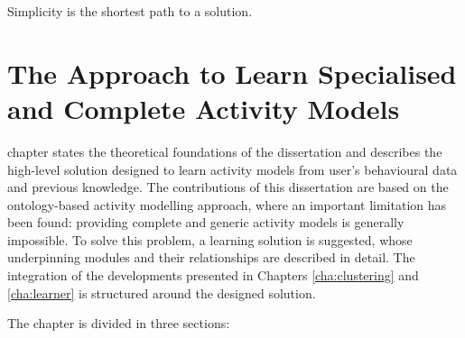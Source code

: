 

\begin{savequote}[50mm]
Simplicity is the shortest path to a solution.
\end{savequote}


\chapter{The Approach to Learn Specialised and Complete Activity Models}
\label{cha:archi}

\ifpdf
    \graphicspath{{3_approach_to_learning_eam/figures/PDF/}{3_approach_to_learning_eam/figures/PNG/}{3_approach_to_learning_eam/figures/}}
\else
    \graphicspath{{3_approach_to_learning_eam/figures/EPS/}{3_approach_to_learning_eam/figures/}}
\fi

 chapter states the theoretical foundations of the dissertation and describes the high-level solution designed to learn activity models from user's behavioural data and previous knowledge. The contributions of this dissertation are based on the ontology-based activity modelling approach, where an important limitation has been found: providing complete and generic activity models is generally impossible. To solve this problem, a learning solution is suggested, whose underpinning modules and their relationships are described in detail. The integration of the developments presented in Chapters \ref{cha:clustering} and \ref{cha:learner} is structured around the designed solution.


The chapter is divided in three sections:

